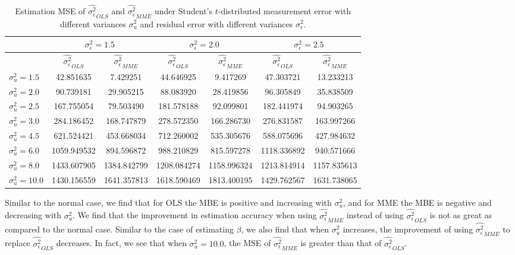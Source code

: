 \documentclass{article}
\begin{document}
\begin{table}[ht]
    \centering
    \caption{Estimation MSE of $\hat{\sigma^2_\epsilon}_{OLS}$ and $\hat{\sigma^2_\epsilon}_{MME}$ under Student's $t$-distributed measurement error with different variances $\sigma^2_u$ and residual error with different variances $\sigma^2_\epsilon$.}
    \label{Tab:MSE_sigma_t}
    \begin{tabular}[t]{lcccccc}
        \hline
        &\multicolumn{2}{c}{$\sigma^2_\epsilon=1.5$}&\multicolumn{2}{c}{$\sigma^2_\epsilon=2.0$}&\multicolumn{2}{c}{$\sigma^2_\epsilon=2.5$}\\
        \hline
        &$\hat{\sigma^2_\epsilon}_{OLS}$&$\hat{\sigma^2_\epsilon}_{MME}$&$\hat{\sigma^2_\epsilon}_{OLS}$&
        $\hat{\sigma^2_\epsilon}_{MME}$&$\hat{\sigma^2_\epsilon}_{OLS}$&$\hat{\sigma^2_\epsilon}_{MME}$\\
        \hline
        $\sigma^2_u = 1.5$&42.851635&7.429251&44.646925&9.417269&47.303721&13.233213\\
        $\sigma^2_u = 2.0$&90.739181&29.905215&88.083920&28.419856&96.305849&35.838509\\
        $\sigma^2_u = 2.5$&167.755054&79.503490&181.578188&92.099801&182.441974&94.903265\\
        $\sigma^2_u = 3.0$&284.186452&168.747879&278.572350&166.286730&276.831587&163.997266\\
        $\sigma^2_u = 4.5$&621.524421&453.668034&712.260002&535.305676&588.075696&427.984632\\
        $\sigma^2_u = 6.0$&1059.949532&894.596872&988.210829&815.597278&1118.336892&940.571666\\
        $\sigma^2_u = 8.0$&1433.607905&1384.842799&1208.084274&1158.996324&1213.814914&1157.835613\\
        $\sigma^2_u = 10.0$&1430.156559&1641.357813&1618.590469&1813.400195&1429.762567&1631.738065\\
        \hline
    \end{tabular}
\end{table}

Similar to the normal case, we find that for OLS the MBE is positive and increasing with $\sigma^2_u$, and for MME the MBE is negative and decreasing with $\sigma^2_u$.
We find that the improvement in estimation accuracy when using $\hat{\sigma^2_\epsilon}_{MME}$ instead of using $\hat{\sigma^2_\epsilon}_{OLS}$ is not as great as compared to the normal case.
Similar to the case of estimating $\beta$, we also find that when $\sigma^2_u$ increases, the improvement of using $\hat{\sigma^2_\epsilon}_{MME}$ to replace $\hat{\sigma^2_\epsilon}_{OLS}$ decreases.
In fact, we see that when $\sigma^2_u = 10.0$, the MSE of $\hat{\sigma^2_\epsilon}_{MME}$ is greater than that of $\hat{\sigma^2_\epsilon}_{OLS}$. 
\end{document}
